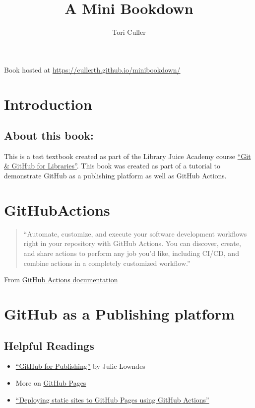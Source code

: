 \documentclass[
  openany]{book}
\title{A Mini Bookdown}
\author{Tori Culler}
\date{}
\providecommand{\tightlist}{%
  \setlength{\itemsep}{0pt}\setlength{\parskip}{0pt}}
\begin{document}
\maketitle

{
\setcounter{tocdepth}{1}
\tableofcontents
}
Book hosted at \url{https://cullerth.github.io/minibookdown/}

\chapter{Introduction}\label{introduction}

\section{About this book:}\label{about-this-book}

This is a test textbook created as part of the Library Juice Academy course \href{https://libraryjuiceacademy.com/shop/course/268-git-and-github-for-libraries/}{``Git \& GitHub for Libraries''}.
This book was created as part of a tutorial to demonstrate GitHub as a publishing platform as well as GitHub Actions.

\chapter{GitHubActions}\label{githubactions}

\begin{quote}
``Automate, customize, and execute your software development workflows right in your repository with GitHub Actions. You can discover, create, and share actions to perform any job you'd like, including CI/CD, and combine actions in a completely customized workflow.''
\end{quote}

From \href{https://docs.github.com/en/actions}{GitHub Actions documentation}

\chapter{GitHub as a Publishing platform}\label{github-as-a-publishing-platform}

\section{Helpful Readings}\label{helpful-readings}

\begin{itemize}
\tightlist
\item
  \href{https://openscapes.github.io/series/github-pub.html}{``GitHub for Publishing''} by Julie Lowndes
\item
  More on \href{https://docs.github.com/en/pages/quickstart?library=true}{GitHub Pages}
\item
  \href{https://medium.com/@danieljimgarcia/publishing-static-sites-to-github-pages-using-github-actions-8040f57dfeaf}{``Deploying static sites to GitHub Pages using GitHub Actions''}
\end{itemize}
\end{document}
